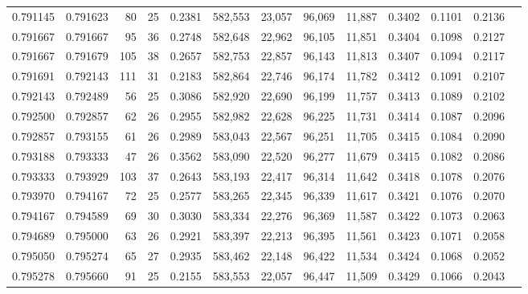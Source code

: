 \begin{tabular}{rrrrrrrrrrrrr}
0.791145 & 0.791623 &     80 &    25 &                                     0.2381 & 582,553 &  23,057 &  96,069 &  11,887 & 0.3402 & 0.1101 & 0.2136 \\
0.791667 & 0.791667 &     95 &    36 &                                     0.2748 & 582,648 &  22,962 &  96,105 &  11,851 & 0.3404 & 0.1098 & 0.2127 \\
0.791667 & 0.791679 &    105 &    38 &                                     0.2657 & 582,753 &  22,857 &  96,143 &  11,813 & 0.3407 & 0.1094 & 0.2117 \\
0.791691 & 0.792143 &    111 &    31 &                                     0.2183 & 582,864 &  22,746 &  96,174 &  11,782 & 0.3412 & 0.1091 & 0.2107 \\
0.792143 & 0.792489 &     56 &    25 &                                     0.3086 & 582,920 &  22,690 &  96,199 &  11,757 & 0.3413 & 0.1089 & 0.2102 \\
0.792500 & 0.792857 &     62 &    26 &                                     0.2955 & 582,982 &  22,628 &  96,225 &  11,731 & 0.3414 & 0.1087 & 0.2096 \\
0.792857 & 0.793155 &     61 &    26 &                                     0.2989 & 583,043 &  22,567 &  96,251 &  11,705 & 0.3415 & 0.1084 & 0.2090 \\
0.793188 & 0.793333 &     47 &    26 &                                     0.3562 & 583,090 &  22,520 &  96,277 &  11,679 & 0.3415 & 0.1082 & 0.2086 \\
0.793333 & 0.793929 &    103 &    37 &                                     0.2643 & 583,193 &  22,417 &  96,314 &  11,642 & 0.3418 & 0.1078 & 0.2076 \\
0.793970 & 0.794167 &     72 &    25 &                                     0.2577 & 583,265 &  22,345 &  96,339 &  11,617 & 0.3421 & 0.1076 & 0.2070 \\
0.794167 & 0.794589 &     69 &    30 &                                     0.3030 & 583,334 &  22,276 &  96,369 &  11,587 & 0.3422 & 0.1073 & 0.2063 \\
0.794689 & 0.795000 &     63 &    26 &                                     0.2921 & 583,397 &  22,213 &  96,395 &  11,561 & 0.3423 & 0.1071 & 0.2058 \\
0.795050 & 0.795274 &     65 &    27 &                                     0.2935 & 583,462 &  22,148 &  96,422 &  11,534 & 0.3424 & 0.1068 & 0.2052 \\
0.795278 & 0.795660 &     91 &    25 &                                     0.2155 & 583,553 &  22,057 &  96,447 &  11,509 & 0.3429 & 0.1066 & 0.2043 \\

\end{tabular}

